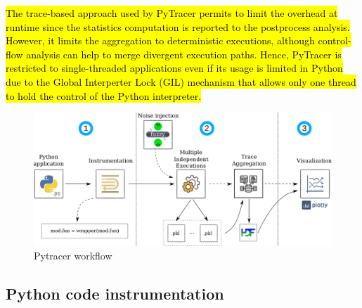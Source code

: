 \documentclass[10pt,journal,compsoc]{IEEEtran}
\DeclareRobustCommand{\add}[1]{\sethlcolor{lightgreen}\hl{#1}}
\begin{document}
\add{
    The trace-based approach used by PyTracer permits to limit the 
    overhead at runtime since the statistics computation is reported to the postprocess analysis.
    However, it limits the aggregation to deterministic executions,
    although control-flow analysis can help to merge divergent execution paths.
    Hence, PyTracer is restricted to single-threaded applications even if its usage
    is limited in Python due to the Global Interperter Lock (GIL) mechanism
    that allows only one thread to hold the control of the Python interpreter.
}



\begin{figure}
    \centering
    \includegraphics[width=0.75\linewidth]{figure/workflow.pdf}
    \caption{Pytracer workflow
    }
    \label{fig:workflow}
\end{figure}

\subsection{Python code instrumentation}

\end{document}
